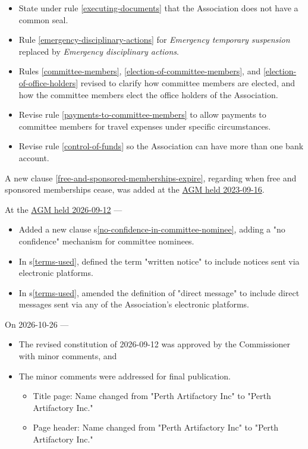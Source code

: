 \documentclass[../constitution.tex]{subfiles}
\begin{document}
\begin{itemize}
    \item State under rule \ref{executing-documents} that the Association does not have a common seal.
    \item Rule \ref{emergency-disciplinary-actions} for \textit{Emergency temporary suspension} replaced by \textit{Emergency disciplinary actions}.
    \item Rules \ref{committee-members}, \ref{election-of-committee-members}, and \ref{election-of-office-holders} revised to clarify how committee members are elected, and how the committee members elect the office holders of the Association.
    \item Revise rule \ref{payments-to-committee-members} to allow payments to committee members for travel expenses under specific circumstances.
    \item Revise rule \ref{control-of-funds} so the Association can have more than one bank account.

\end{itemize}

A new clause \ref{free-and-sponsored-memberships-expire}, regarding when free and sponsored memberships cease, was added at the \href{https://wiki.artifactory.org.au/en/minutes/AGM/2023-09-16}{AGM held 2023-09-16}.

At the \href{https://wiki.artifactory.org.au/en/minutes/AGM/2026-09-12}{AGM held 2026-09-12} ---

\begin{itemize}
    \item Added a new clause s\ref{no-confidence-in-committee-nominee}, adding a "no confidence" mechanism for committee nominees.
    \item In s\ref{terms-used}, defined the term "written notice" to include notices sent via electronic platforms.
    \item In s\ref{terms-used}, amended the definition of "direct message" to include direct messages sent via any of the Association's electronic platforms.
\end{itemize}

On 2026-10-26 ---

\begin{itemize}
    \item The revised constitution of 2026-09-12 was approved by the Commissioner with minor comments, and
    \item The minor comments were addressed for final publication.
          \begin{itemize}
              \item Title page: Name changed from "Perth Artifactory Inc" to "Perth Artifactory Inc."
              \item Page header: Name changed from "Perth Artifactory Inc" to "Perth Artifactory Inc."
          \end{itemize}
\end{itemize}
\end{document}
